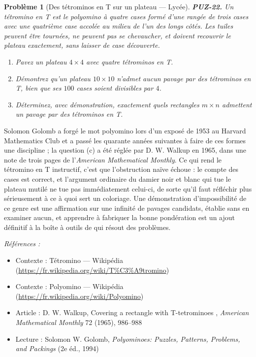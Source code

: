 \documentclass[11pt]{article}
\newtheorem{problem}{Problème}
\newenvironment{refs}{\par\small\noindent\emph{Références :}\begin{itemize}\setlength\itemsep{0pt}}{\end{itemize}\normalsize}
\begin{document}
\bigskip

\begin{problem}[{Des tétrominos en T sur un plateau --- Lycée}]
\textbf{PUZ-22.} Un tétromino en T est le polyomino à quatre cases formé d'une rangée de trois cases avec une quatrième case accolée au milieu de l'un des longs côtés. Les tuiles peuvent être tournées, ne peuvent pas se chevaucher, et doivent recouvrir le plateau exactement, sans laisser de case découverte.
\begin{enumerate}
\item[(a)] Pavez un plateau $ 4 \times 4 $ avec quatre tétrominos en T.
\item[(b)] Démontrez qu'un plateau $ 10 \times 10 $ n'admet aucun pavage par des tétrominos en T, bien que ses $ 100 $ cases soient divisibles par $ 4 $.
\item[(c)] Déterminez, avec démonstration, exactement quels rectangles $ m \times n $ admettent un pavage par des tétrominos en T.
\end{enumerate}

\end{problem}

\noindent Solomon Golomb a forgé le mot \og{} polyomino \fg{} lors d'un exposé de 1953 au Harvard Mathematics Club et a passé les quarante années suivantes à faire de ces formes une discipline ; la question (c) a été réglée par D. W. Walkup en 1965, dans une note de trois pages de l'\textit{American Mathematical Monthly}. Ce qui rend le tétromino en T instructif, c'est que l'obstruction naïve échoue : le compte des cases est correct, et l'argument ordinaire du damier noir et blanc qui tue le plateau mutilé ne tue pas immédiatement celui-ci, de sorte qu'il faut réfléchir plus sérieusement à ce à quoi sert un coloriage. Une démonstration d'impossibilité de ce genre est une affirmation sur une infinité de pavages candidats, établie sans en examiner aucun, et apprendre à fabriquer la bonne pondération est un ajout définitif à la boîte à outils de qui résout des problèmes.

\begin{refs}
\item Contexte : Tétromino --- Wikipédia (\url{https://fr.wikipedia.org/wiki/T%C3%A9tromino})
\item Contexte : Polyomino --- Wikipédia (\url{https://fr.wikipedia.org/wiki/Polyomino})
\item Article : D. W. Walkup, \og{} Covering a rectangle with T-tetrominoes \fg{}, \textit{American Mathematical Monthly} 72 (1965), 986--988
\item Lecture : Solomon W. Golomb, \textit{Polyominoes: Puzzles, Patterns, Problems, and Packings} (2e éd., 1994)
\end{refs}
\end{document}
